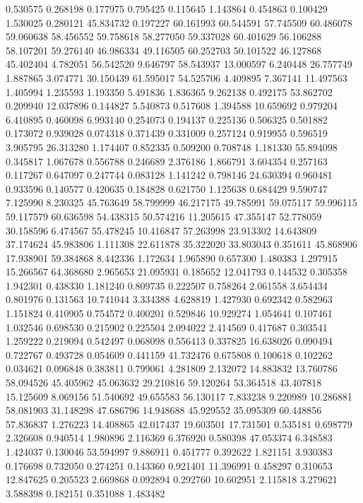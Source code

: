 0.530575
0.268198
0.177975
0.795425
0.115645
1.143864
0.454863
0.100429
1.530025
0.280121
45.834732
0.197227
60.161993
60.544591
57.745509
60.486078
59.060638
58.456552
59.758618
58.277050
59.337028
60.401629
56.106288
58.107201
59.276140
46.986334
49.116505
60.252703
50.101522
46.127868
45.402404
4.782051
56.542520
9.646797
58.543937
13.000597
6.240448
26.757749
1.887865
3.074771
30.150439
61.595017
54.525706
4.409895
7.367141
11.497563
1.405994
1.235593
1.193350
5.491836
1.836365
9.262138
0.492175
53.862702
0.209940
12.037896
0.144827
5.540873
0.517608
1.394588
10.659692
0.979204
6.410895
0.460098
6.993140
0.254073
0.194137
0.225136
0.506325
0.501882
0.173072
0.939028
0.074318
0.371439
0.331009
0.257124
0.919955
0.596519
3.905795
26.313280
1.174407
0.852335
0.509200
0.708748
1.181330
55.894098
0.345817
1.067678
0.556788
0.246689
2.376186
1.866791
3.604354
0.257163
0.117267
0.647097
0.247744
0.083128
1.141242
0.798146
24.630394
0.960481
0.933596
0.140577
0.420635
0.184828
0.621750
1.125638
0.684429
9.590747
7.125990
8.230325
45.763649
58.799999
46.217175
49.785991
59.075117
59.996115
59.117579
60.636598
54.438315
50.574216
11.205615
47.355147
52.778059
30.158596
6.474567
55.478245
10.416847
57.263998
23.913302
14.643809
37.174624
45.983806
1.111308
22.611878
35.322020
33.803043
0.351611
45.868906
17.938901
59.384868
8.442336
1.172634
1.965890
0.657300
1.480383
1.297915
15.266567
64.368680
2.965653
21.095931
0.185652
12.041793
0.144532
0.305358
1.942301
0.438330
1.181240
0.809735
0.222507
0.758264
2.061558
3.654434
0.801976
0.131563
10.741044
3.334388
4.628819
1.427930
0.692342
0.582963
1.151824
0.410905
0.754572
0.400201
0.529846
10.929274
1.054641
0.107461
1.032546
0.698530
0.215902
0.225504
2.094022
2.414569
0.417687
0.303541
1.259222
0.219094
0.542497
0.068098
0.556413
0.337825
16.638026
0.090494
0.722767
0.493728
0.054609
0.441159
41.732476
0.675808
0.100618
0.102262
0.034621
0.096848
0.383811
0.799061
4.281809
2.132072
14.883832
13.760786
58.094526
45.405962
45.063632
29.210816
59.120264
53.364518
43.407818
15.125609
8.069156
51.540692
49.655583
56.130117
7.833238
9.220989
10.286881
58.081903
31.148298
47.686796
14.948688
45.929552
35.095309
60.448856
57.836837
1.276223
14.408865
42.017437
19.603501
17.731501
0.535181
0.698779
2.326608
0.940514
1.980896
2.116369
6.376920
0.580398
47.053374
6.348583
1.424037
0.130046
53.594997
9.886911
0.451777
0.392622
1.821151
3.930383
0.176698
0.732050
0.274251
0.143360
0.921401
11.396991
0.458297
0.310653
12.847625
0.205523
2.669868
0.092894
0.292760
10.602951
2.115818
3.279621
3.588398
0.182151
0.351088
1.483482
